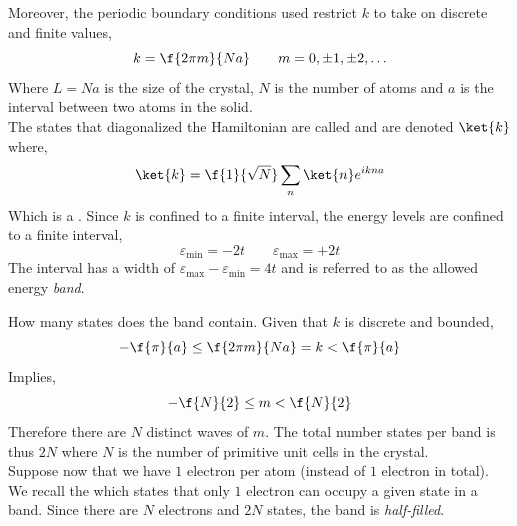\documentclass{article}
\begin{document}
Moreover, the periodic boundary conditions used restrict $k$ to take on discrete and finite values,
\[ k = \f{2 \pi m}{Na} \qquad m = 0, \pm 1, \pm 2, \ldots \]
Where $L = Na$ is the size of the crystal, $N$ is the number of atoms and $a$ is the interval between two atoms in the solid.\\

The states that diagonalized the Hamiltonian are called  and are denoted $\ket{k}$ where,
\[ \ket{k} = \f{1}{\sqrt{N}} \sum_{n} \ket{n} e^{i k na} \]
Which is a . Since $k$ is confined to a finite interval, the energy levels are confined to a finite interval,
\[ \varepsilon_{\min} = - 2t \qquad \varepsilon_{\max} = + 2t \]
The interval has a width of $\varepsilon_{\max} - \varepsilon_{\min} = 4t$ and is referred to as the allowed energy \textit{band}.

\begin{center}
\end{center}

How many states does the band contain. Given that $k$ is discrete and bounded,
\[ -\f{\pi}{a} \leq \f{2 \pi m}{Na} = k < \f{\pi}{a} \]
Implies,
\[ -\f{N}{2} \leq m < \f{N}{2} \]
Therefore there are $N$ distinct waves of $m$. The total number states per band is thus $2N$ where $N$ is the number of primitive unit cells in the crystal.\\

Suppose now that we have $1$ electron per atom (instead of $1$ electron in total). We recall the  which states that only $1$ electron can occupy a given state in a band. Since there are $N$ electrons and $2N$ states, the band is \textit{half-filled}.
\begin{center}
\end{center}
\end{document}
